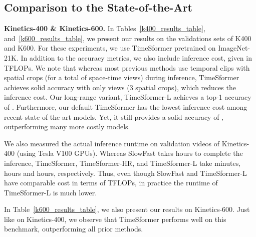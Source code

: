 \documentclass{article}
\begin{document}
\subsection{Comparison to the State-of-the-Art}
\label{sota_sec}














\textbf{Kinetics-400 \& Kinetics-600.} In Tables~\ref{k400_results_table}, and~\ref{k600_results_table}, we present our results on the validations sets of K400 and K600. For these experiments, we use TimeSformer pretrained on ImageNet-21K. In addition to the accuracy metrics, we also include inference cost, given in TFLOPs. We note that whereas most previous methods use  temporal clips with  spatial crops (for a total of  space-time views) during inference, TimeSformer achieves solid accuracy with only  views (3 spatial crops), which reduces the inference cost. Our long-range variant, TimeSformer-L achieves a top-1 accuracy of . Furthermore, our default TimeSformer has the lowest inference cost among recent state-of-the-art models. Yet, it still provides a solid accuracy of , outperforming many more costly models. 

We also measured the actual inference runtime on  validation videos of Kinetics-400 (using  Tesla V100 GPUs). Whereas SlowFast takes  hours to complete the inference, TimeSformer, TimeSformer-HR, and TimeSformer-L take  minutes,  hours and  hours, respectively. Thus, even though SlowFast and TimeSformer-L have comparable cost in terms of TFLOPs, in practice the runtime of TimeSformer-L is much lower. 

In Table~\ref{k600_results_table}, we also present our results on Kinetics-600. Just like on Kinetics-400, we observe that TimeSformer performs well on this benchmark, outperforming all prior methods.







 
\end{document}
